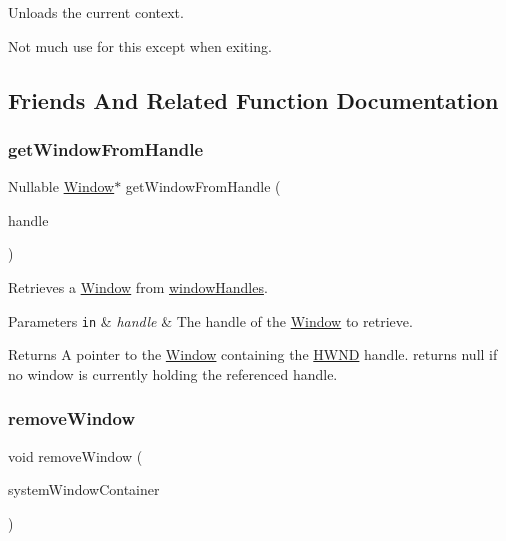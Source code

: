 Unloads the current context.

Not much use for this except when exiting. 

\subsection{Friends And Related Function Documentation}
\mbox{\label{class_window_a56aa20fd34aba260a2f15d54541ea396}} 
\subsubsection{\texorpdfstring{get\+Window\+From\+Handle}{getWindowFromHandle}}
{\footnotesize\ttfamily Nullable \mbox{\hyperlink{class_window}{Window}}$\ast$ get\+Window\+From\+Handle (\begin{DoxyParamCaption}\item[{H\+W\+ND}]{handle }\end{DoxyParamCaption})\hspace{0.3cm}{\ttfamily [friend]}}

Retrieves a \mbox{\hyperlink{class_window}{Window}} from \mbox{\hyperlink{_win32_window_8cpp_a0694e9af65d10d69624aa9a76b32cecd}{window\+Handles}}.


\begin{DoxyParams}[1]{Parameters}
\mbox{\tt in}  & {\em handle} & The handle of the \mbox{\hyperlink{class_window}{Window}} to retrieve. \\
\hline
\end{DoxyParams}
\begin{DoxyReturn}{Returns}
A pointer to the \mbox{\hyperlink{class_window}{Window}} containing the \mbox{\hyperlink{}{H\+W\+ND}} {\ttfamily handle}. returns null if no window is currently holding the referenced handle. 
\end{DoxyReturn}
\mbox{\label{class_window_ac4632fb84e38a760660b81ad8663d4a6}} 
\subsubsection{\texorpdfstring{remove\+Window}{removeWindow}}
{\footnotesize\ttfamily void remove\+Window (\begin{DoxyParamCaption}\item[{\mbox{\hyperlink{class_not_null}{Not\+Null}}$<$ \mbox{\hyperlink{class_window}{Window}} $>$}]{system\+Window\+Container }\end{DoxyParamCaption})\hspace{0.3cm}{\ttfamily [friend]}}

